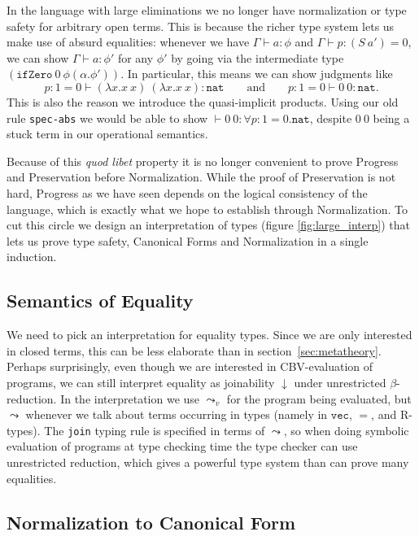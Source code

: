 \documentclass[copyright]{eptcs}
\newcommand{\vc}[0]{\texttt{vec}}
\newcommand{\nat}[0]{\texttt{nat}}
\newcommand{\leadstov}[0]{\leadsto_v}
\newcommand{\ifzero}[0]{\texttt{ifZero}}
\begin{document}
In the language with large eliminations we no longer have
normalization or type safety for arbitrary open terms. This is because
the richer type system lets us make use of absurd equalities: whenever we
have $\Gamma \vdash a : \phi$ and $\Gamma \vdash p : (S\ a')\!=\!0$, we can
show $\Gamma \vdash a : \phi'$ for any $\phi'$ by going via the
intermediate type $(\ifzero\ 0\ \phi (\alpha.\phi'))$. In particular, this
means we  can show judgments like
\[ 
p:1\!\!=\!0 \vdash (\lambda  x.x\ x)\ (\lambda x.x\ x) : \nat
\qquad\text{and}\qquad 
p:1\!\!=\!0 \vdash 0\ 0 : \nat. 
\]
This is also the reason we introduce the quasi-implicit
products. Using our old rule \texttt{spec-abs} we would be able to
show $\vdash 0\ 0 : \forall p:1\!\!=\!0.\nat$, despite $0\ 0$ being a
stuck term in our operational semantics.

Because of this \emph{quod libet} property it is no longer convenient
to prove Progress and Preservation before Normalization. While the
proof of Preservation is not hard, Progress as we have seen depends on
the logical consistency of the language, which is exactly what we hope
to establish through Normalization. To cut this circle we design an
interpretation of types (figure \ref{fig:large_interp}) that lets us
prove type safety, Canonical Forms and Normalization in a single
induction.

\subsection{Semantics of Equality}
We need to pick an interpretation for equality types. Since we
are only interested in closed terms, this can be less elaborate than
in section~\ref{sec:metatheory}. Perhaps surprisingly, even though we
are interested in CBV-evaluation of programs, we can still interpret
equality as joinability $\downarrow$ under unrestricted $\beta$-reduction. 
In the interpretation we use $\leadstov$ for the
program being evaluated, but $\leadsto$ whenever we talk about terms
occurring in types (namely in $\vc$, $=$, and R-types). The
\texttt{join} typing rule is specified in terms of $\leadsto$, so
when doing symbolic evaluation of programs at type checking time the 
type checker can use unrestricted reduction, which gives a powerful
type system than can prove many equalities.

\subsection{Normalization to Canonical Form}
\end{document}
